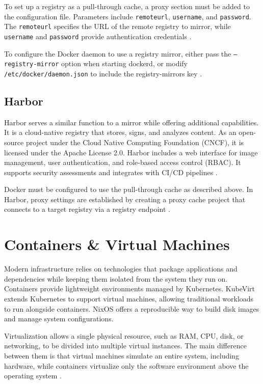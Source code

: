 To set up a registry as a pull-through cache, a proxy section must be added to the configuration file. Parameters include \texttt{remoteurl}, \texttt{username}, and \texttt{password}. The \texttt{remoteurl} specifies the URL of the remote registry to mirror, while \texttt{username} and \texttt{password} provide authentication credentials \cite{dockerhubmirror}.

To configure the Docker daemon to use a registry mirror, either pass the \texttt{--registry-mirror} option when starting dockerd, or modify \texttt{/etc/docker/\allowbreak daemon.json} to include the registry-mirrors key \cite{dockerhubmirror}.

\subsection{Harbor}
Harbor serves a similar function to a mirror while offering additional capabilities. It is a cloud-native registry that stores, signs, and analyzes content. As an open-source project under the Cloud Native Computing Foundation (CNCF), it is licensed under the Apache License 2.0. Harbor includes a web interface for image management, user authentication, and role-based access control (RBAC). It supports security assessments and integrates with CI/CD pipelines \cite{harbor}.

Docker must be configured to use the pull-through cache as described above. In Harbor, proxy settings are established by creating a proxy cache project that connects to a target registry via a registry endpoint \cite{harbor}.

\section{Containers \& Virtual Machines} \label{sec:vm_vs_container}
Modern infrastructure relies on technologies that package applications and dependencies while keeping them isolated from the system they run on. Containers provide lightweight environments managed by Kubernetes. KubeVirt extends Kubernetes to support virtual machines, allowing traditional workloads to run alongside containers. NixOS offers a reproducible way to build disk images and manage system configurations.

Virtualization allows a single physical resource, such as RAM, CPU, disk, or networking, to be divided into multiple virtual instances. The main difference between them is that virtual machines simulate an entire system, including hardware, while containers virtualize only the software environment above the operating system \cite{atlassian_containers_vs_vms}.

